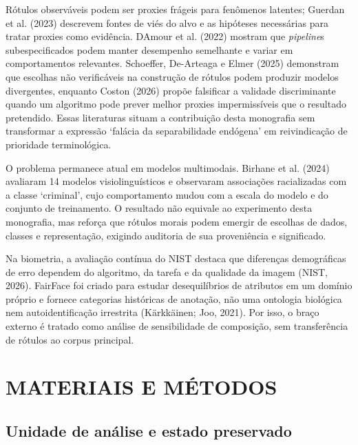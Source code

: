 Rótulos observáveis podem ser proxies frágeis para fenômenos latentes; Guerdan et al. (2023) descrevem fontes de viés do alvo e as hipóteses necessárias para tratar proxies como evidência. D\textquotesingle Amour et al. (2022) mostram que \emph{pipeline}s subespecificados podem manter desempenho semelhante e variar em comportamentos relevantes. Schoeffer, De-Arteaga e Elmer (2025) demonstram que escolhas não verificáveis na construção de rótulos podem produzir modelos divergentes, enquanto Coston (2026) propõe falsificar a validade discriminante quando um algoritmo pode prever melhor proxies impermissíveis que o resultado pretendido. Essas literaturas situam a contribuição desta monografia sem transformar a expressão `falácia da separabilidade endógena' em reivindicação de prioridade terminológica.

O problema permanece atual em modelos multimodais. Birhane et al. (2024) avaliaram 14 modelos visiolinguísticos e observaram associações racializadas com a classe `criminal', cujo comportamento mudou com a escala do modelo e do conjunto de treinamento. O resultado não equivale ao experimento desta monografia, mas reforça que rótulos morais podem emergir de escolhas de dados, classes e representação, exigindo auditoria de sua proveniência e significado.

Na biometria, a avaliação contínua do NIST destaca que diferenças demográficas de erro dependem do algoritmo, da tarefa e da qualidade da imagem (NIST, 2026). FairFace foi criado para estudar desequilíbrios de atributos em um domínio próprio e fornece categorias históricas de anotação, não uma ontologia biológica nem autoidentificação irrestrita (Kärkkäinen; Joo, 2021). Por isso, o braço externo é tratado como análise de sensibilidade de composição, sem transferência de rótulos ao corpus principal.

\chapter{MATERIAIS E MÉTODOS}

\section{Unidade de análise e estado preservado}

